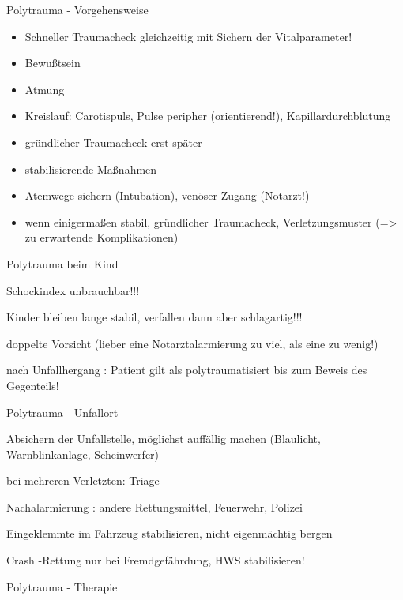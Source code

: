 \documentclass{article}
\begin{document}
Polytrauma - Vorgehensweise

\begin{itemize}
\item Schneller Traumacheck gleichzeitig  mit  Sichern der
Vitalparameter!

\item Bewu{\ss}tsein

\item Atmung

\item Kreislauf: Carotispuls, Pulse peripher  (orientierend!),
Kapillardurchblutung

\item gr\"undlicher Traumacheck erst sp\"ater

\item stabilisierende Ma{\ss}nahmen

\item Atemwege sichern (Intubation),  ven\"oser  Zugang (Notarzt!)

\item wenn einigerma{\ss}en stabil, gr\"undlicher  Traumacheck,
Verletzungsmuster (={\textgreater} zu  erwartende Komplikationen)

\end{itemize}
Polytrauma beim Kind

Schockindex unbrauchbar!!!

Kinder bleiben lange stabil, verfallen  dann aber schlagartig!!!

doppelte Vorsicht (lieber eine  Notarztalarmierung zu viel, als eine zu 
wenig!)

nach Unfallhergang : Patient gilt als polytraumatisiert  bis zum Beweis 
des Gegenteils! 

Polytrauma - Unfallort

Absichern  der Unfallstelle,  m\"oglichst auff\"allig machen (Blaulicht,
 Warnblinkanlage, Scheinwerfer)

bei mehreren Verletzten: Triage

Nachalarmierung : andere  Rettungsmittel, Feuerwehr, Polizei

Eingeklemmte im Fahrzeug stabilisieren,  nicht eigenm\"achtig bergen

Crash -Rettung nur  bei  Fremdgef\"ahrdung, HWS stabilisieren!

Polytrauma - Therapie
\end{document}
